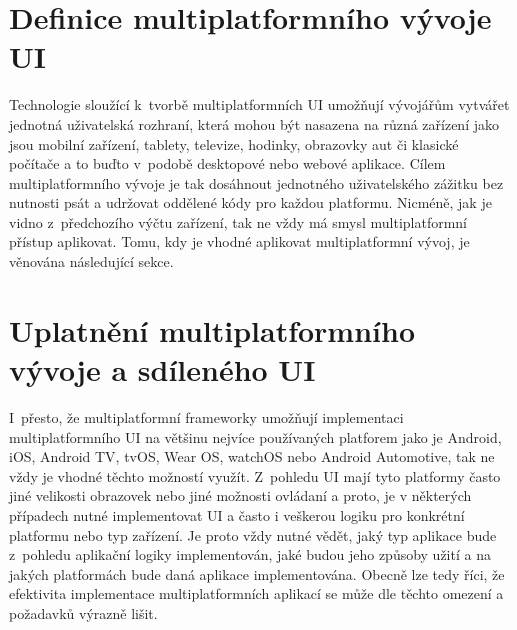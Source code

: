 \begin{sloppypar}
\section{Definice multiplatformního vývoje UI}
Technologie sloužící k~tvorbě multiplatformních UI umožňují vývojářům vytvářet jednotná uživatelská rozhraní, 
která mohou být nasazena na různá zařízení jako jsou mobilní zařízení, tablety, televize, hodinky, obrazovky aut či 
klasické počítače a to buďto v~podobě desktopové nebo webové aplikace. Cílem multiplatformního vývoje je tak dosáhnout jednotného 
uživatelského zážitku bez nutnosti psát a udržovat oddělené kódy pro každou platformu. Nicméně, jak je vidno z~předchozího výčtu zařízení, 
tak ne vždy má smysl multiplatformní přístup aplikovat. Tomu, kdy je vhodné aplikovat multiplatformní vývoj, je věnována následující sekce.  
\end{sloppypar}


\section{Uplatnění multiplatformního vývoje a sdíleného UI}
I~přesto, že multiplatformní frameworky umožňují implementaci multiplatformního UI na většinu nejvíce používaných platforem jako je Android, iOS,
Android TV, tvOS, Wear OS, watchOS nebo Android Automotive, tak ne vždy je vhodné těchto možností využít. Z~pohledu UI mají tyto platformy často jiné 
velikosti obrazovek nebo jiné možnosti ovládaní a proto, je v některých případech nutné implementovat UI a často i veškerou logiku pro konkrétní platformu
nebo typ zařízení. Je proto vždy nutné vědět, jaký typ aplikace bude z~pohledu aplikační logiky implementován, jaké budou jeho způsoby užití a na jakých 
platformách bude daná aplikace implementována.
Obecně lze tedy říci, že efektivita implementace multiplatformních aplikací se může dle těchto omezení a požadavků výrazně lišit.


